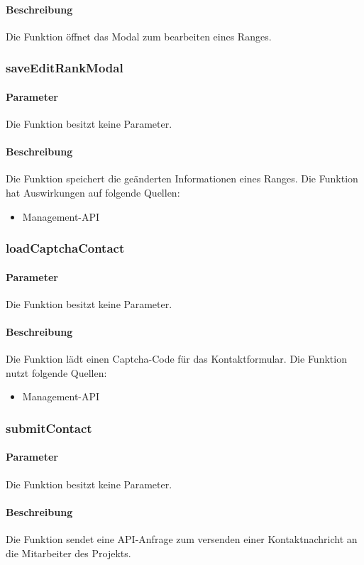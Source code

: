 \paragraph{Beschreibung} Die Funktion öffnet das Modal zum bearbeiten eines Ranges.
\subsubsection{saveEditRankModal}
\paragraph{Parameter} Die Funktion besitzt keine Parameter.
\paragraph{Beschreibung} Die Funktion speichert die geänderten Informationen eines Ranges. Die Funktion hat Auswirkungen auf folgende Quellen:
\begin{itemize}
	\item Management-API
\end{itemize}
\subsubsection{loadCaptchaContact}
\paragraph{Parameter} Die Funktion besitzt keine Parameter.
\paragraph{Beschreibung} Die Funktion lädt einen Captcha-Code für das Kontaktformular. Die Funktion nutzt folgende Quellen:
\begin{itemize}
	\item Management-API
\end{itemize}
\subsubsection{submitContact}
\paragraph{Parameter} Die Funktion besitzt keine Parameter.
\paragraph{Beschreibung} Die Funktion sendet eine API-Anfrage zum versenden einer Kontaktnachricht an die Mitarbeiter des Projekts.
